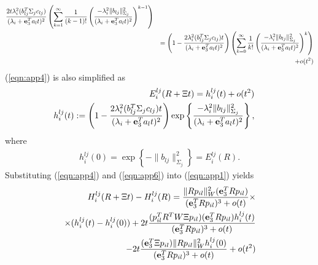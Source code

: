 \documentclass[conference,letterpaper]{ieeeconf}
\begin{document}
\begin{eqnarray}
\frac{2t\lambda_i^2(b_{lj}^T \Sigma_j c_{lj})}{ (\lambda_i + {\bf e}_3^Ta_{l}t)^2}
\left(
\sum_{k = 1}^{\infty}
\frac{1}{(k-1)!}
\left(
\frac{-\lambda_i^2\|b_{lj}\|^2_{\Sigma_j}}{ (\lambda_i + {\bf e}_3^Ta_{l}t)^2}
\right)^{k-1}\right)
\nonumber\\
\hspace{-.8cm}&&=
\left(
1 - \frac{2\lambda_i^2(b_{lj}^T \Sigma_j c_{lj})t}{ (\lambda_i + {\bf e}_3^Ta_{l}t)^2}
\right)
\left(\sum_{k = 0}^{\infty}
\frac{1}{k!}
\left(
\frac{-\lambda_i^2\|b_{lj}\|^2_{\Sigma_j}}{ (\lambda_i + {\bf e}_3^Ta_{l}t)^2}
\right)^k\right) 
\nonumber\\
\hspace{-.8cm}&&\hspace{4.4cm}
+ o(t^2)
\label{eqn:app4}
\end{eqnarray}
(\ref{eqn:app4}) is also simplified as
\begin{eqnarray}
\hspace{-.8cm}&&E^{lj}_i(R + \Xi t) =
h_i^{lj}(t)+o(t^2)
\label{eqn:app4}\\
\hspace{-.8cm}&&h_i^{lj}(t) :=
\left(
1 - \frac{2\lambda_i^2(b_{lj}^T \Sigma_j c_{lj})t}{ (\lambda_i + {\bf e}_3^Ta_{l}t)^2}
\right)
\exp\left\{
\frac{-\lambda_i^2\|b_{lj}\|^2_{\Sigma_j}}{ (\lambda_i + {\bf e}_3^Ta_{l}t)^2}
\right\},
\nonumber
\end{eqnarray}
where
\begin{eqnarray}
h_i^{lj}(0) = 
\exp\left\{-\|b_{lj}\|^2_{\Sigma_j}
\right\} 
= E_i^{lj}(R).
\label{eqn:app6}
\end{eqnarray}
Substituting (\ref{eqn:app4}) and (\ref{eqn:app6}) 
into (\ref{eqn:app1}) yields
\begin{eqnarray}
\hspace{-.8cm}&& H^{lj}_i(R + \Xi t) -  H^{lj}_i(R)
=  
\frac{\|Rp_{il}\|_W^2({\bf e}_3^T R p_{il})}
{({\bf e}_3^TR p_{il})^3 + o(t)}\times
\nonumber\\
\hspace{-.8cm}&& \hspace{.5cm} 
\times (h_i^{lj}(t) - h_i^{lj}(0))
+ 2t\frac{
(p_{il}^TR^TW\Xi p_{il})
({\bf e}_3^T R p_{il})h_i^{lj}(t)
}{({\bf e}_3^TR p_{il})^3 + o(t)}
\nonumber\\
\hspace{-.8cm}&& \hspace{.5cm} 
- 2t\frac{
({\bf e}_3^T\Xi p_{il})
\|Rp_{il}\|_W^2 h_i^{lj}(0)
}{({\bf e}_3^TR p_{il})^3 + o(t)}
+ o(t^2)
\label{eqn:app7}
\end{eqnarray}
\end{document}
